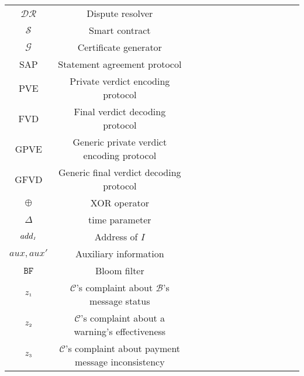 \begin{table*}[!htbp]
\begin{scriptsize}
\begin{center}
{{\begin{tabular}{|c|c|c|c|c|c|c|c|c|c|c|c|c|c|}
%
\cellcolor{white!20}\scriptsize$\mathcal{DR}$ &\cellcolor{white!20}\scriptsize Dispute resolver  \\  
%
\cellcolor{gray!20}\scriptsize$\mathcal{S}$ &\cellcolor{gray!20}\scriptsize Smart contract  \\  
%
\cellcolor{white!20}\scriptsize$\mathcal{G}$ &\cellcolor{white!20}\scriptsize Certificate generator  \\  
%
\cellcolor{gray!20}\scriptsize{SAP} &\cellcolor{gray!20}\scriptsize  Statement agreement protocol\\ 
%
\cellcolor{white!20}\scriptsize{PVE} &\cellcolor{white!20}\scriptsize  Private verdict encoding protocol\\ 
%
\cellcolor{gray!20}\scriptsize{FVD} &\cellcolor{gray!20}\scriptsize  Final verdict decoding protocol\\ 
%
\cellcolor{white!20}\scriptsize{GPVE} &\cellcolor{white!20}\scriptsize  Generic private verdict encoding protocol\\ 
%
\cellcolor{gray!20}\scriptsize{GFVD} &\cellcolor{gray!20}\scriptsize  Generic final verdict decoding protocol\\ 
%
\cellcolor{white!20}\scriptsize$\oplus$ &\cellcolor{white!20}\scriptsize  XOR operator \\ 
%
\cellcolor{gray!20}\scriptsize$\Delta$ &\cellcolor{gray!20}\scriptsize  time parameter \\ 
%
\cellcolor{white!20}\scriptsize$add_{\scriptscriptstyle I}$ &\cellcolor{white!20}\scriptsize  Address of $I$\\ 
%
\cellcolor{gray!20}\scriptsize$aux, aux'$ &\cellcolor{gray!20}\scriptsize  Auxiliary information\\ 
%
\cellcolor{white!20}\scriptsize$\mathtt{BF}$ &\cellcolor{white!20}\scriptsize  Bloom filter\\ 
%
\cellcolor{gray!20}\scriptsize$z_{\scriptscriptstyle 1}$ &\cellcolor{gray!20}\scriptsize  $\mathcal{C}$'s complaint about $\mathcal{B}$'s message status\\ 
%
\cellcolor{white!20}\scriptsize$z_{\scriptscriptstyle 2}$ &\cellcolor{white!20}\scriptsize  $\mathcal{C}$'s complaint about a warning's effectiveness\\
% 
\cellcolor{gray!20}\scriptsize$z_{\scriptscriptstyle 3}$ &\cellcolor{gray!20}\scriptsize  $\mathcal{C}$'s complaint about payment message  inconsistency\\ 
%




                     
 \hline
  



\end{tabular}}}
\end{center}
\end{scriptsize}
\end{table*}
